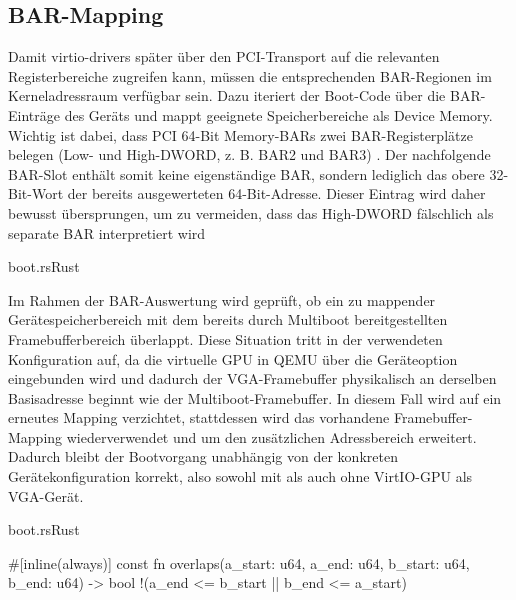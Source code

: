 \subsection{BAR-Mapping}

Damit virtio-drivers später über den PCI-Transport auf die relevanten Registerbereiche zugreifen kann, müssen die entsprechenden BAR-Regionen im Kerneladressraum verfügbar sein. Dazu iteriert der Boot-Code über die BAR-Einträge des Geräts und mappt geeignete Speicherbereiche als Device Memory.\\
Wichtig ist dabei, dass PCI 64-Bit Memory-BARs zwei BAR-Registerplätze belegen (Low- und High-DWORD, z. B. BAR2 und BAR3) \cite{VirtioDriversBarInfo}. Der nachfolgende BAR-Slot enthält somit keine eigenständige BAR, sondern lediglich das obere 32-Bit-Wort der bereits ausgewerteten 64-Bit-Adresse. Dieser Eintrag wird daher bewusst übersprungen, um zu vermeiden, dass das High-DWORD fälschlich als separate BAR interpretiert wird

\begin{codeblock}{boot.rs}{Rust}
\end{codeblock}

Im Rahmen der BAR-Auswertung wird geprüft, ob ein zu mappender Gerätespeicherbereich mit dem bereits durch Multiboot bereitgestellten Framebufferbereich überlappt. Diese Situation tritt in der verwendeten Konfiguration auf, da die virtuelle GPU in QEMU über die Geräteoption  eingebunden wird und dadurch der VGA-Framebuffer physikalisch an derselben Basisadresse beginnt wie der Multiboot-Framebuffer. In diesem Fall wird auf ein erneutes Mapping verzichtet, stattdessen wird das vorhandene Framebuffer-Mapping wiederverwendet und um den zusätzlichen Adressbereich erweitert. Dadurch bleibt der Bootvorgang unabhängig von der konkreten Gerätekonfiguration korrekt, also sowohl mit als auch ohne VirtIO-GPU als VGA-Gerät.

\begin{codeblock}{boot.rs}{Rust}
  \begin{rustcode}
#[inline(always)]
const fn overlaps(a_start: u64, a_end: u64, b_start: u64, b_end: u64) -> bool {
    !(a_end <= b_start || b_end <= a_start)
}
  \end{rustcode}
\end{codeblock}

